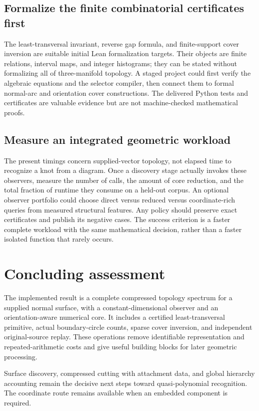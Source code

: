 \subsection{Formalize the finite combinatorial certificates first}

The least-transversal invariant, reverse gap formula, and finite-support
cover inversion are suitable initial Lean formalization targets. Their
objects are finite relations, interval maps, and integer histograms;
they can be stated without formalizing all of three-manifold topology.
A staged project could first verify the algebraic equations and the
selector compiler, then connect them to formal normal-arc and orientation
cover constructions. The delivered Python tests and certificates are
valuable evidence but are not machine-checked mathematical proofs.

\subsection{Measure an integrated geometric workload}

The present timings concern supplied-vector topology, not elapsed time to
recognize a knot from a diagram. Once a discovery stage actually invokes
these observers, measure the number of calls, the amount of core reduction,
and the total fraction of runtime they consume on a held-out corpus.
An optional observer portfolio could choose direct versus reduced versus
coordinate-rich queries from measured structural features. Any policy
should preserve exact certificates and publish its negative cases. The
success criterion is a faster complete workload with the same mathematical
decision, rather than a faster isolated function that rarely occurs.

\section{Concluding assessment}

The implemented result is a complete compressed topology spectrum for a
supplied normal surface, with a constant-dimensional observer and an
orientation-aware numerical core. It includes a certified least-transversal
primitive, actual boundary-circle counts, sparse cover inversion, and
independent original-source replay. These operations remove identifiable
representation and repeated-arithmetic costs and give useful building
blocks for later geometric processing.

Surface discovery, compressed cutting with attachment data, and global
hierarchy accounting remain the decisive next steps toward quasi-polynomial
recognition. The coordinate route remains available when an embedded
component is required.
